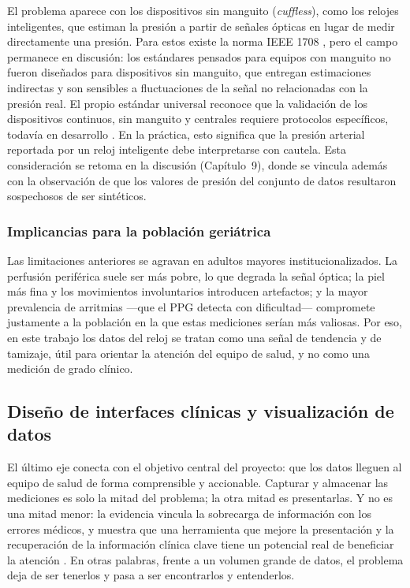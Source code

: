 \documentclass[12pt,a4paper]{article}
\begin{document}
    El problema aparece con los dispositivos sin manguito (\textit{cuffless}), como los relojes inteligentes, que estiman la presión a partir de señales ópticas en lugar de medir directamente una presión. Para estos existe la norma IEEE 1708 \cite{ieee1708}, pero el campo permanece en discusión: los estándares pensados para equipos con manguito no fueron diseñados para dispositivos sin manguito, que entregan estimaciones indirectas y son sensibles a fluctuaciones de la señal no relacionadas con la presión real. El propio estándar universal reconoce que la validación de los dispositivos continuos, sin manguito y centrales requiere protocolos específicos, todavía en desarrollo \cite{stergiou2018}. En la práctica, esto significa que la presión arterial reportada por un reloj inteligente debe interpretarse con cautela. Esta consideración se retoma en la discusión (Capítulo~9), donde se vincula además con la observación de que los valores de presión del conjunto de datos resultaron sospechosos de ser sintéticos.

    \subsubsection{Implicancias para la población geriátrica}
    Las limitaciones anteriores se agravan en adultos mayores institucionalizados. La perfusión periférica suele ser más pobre, lo que degrada la señal óptica; la piel más fina y los movimientos involuntarios introducen artefactos; y la mayor prevalencia de arritmias —que el PPG detecta con dificultad— compromete justamente a la población en la que estas mediciones serían más valiosas. Por eso, en este trabajo los datos del reloj se tratan como una señal de tendencia y de tamizaje, útil para orientar la atención del equipo de salud, y no como una medición de grado clínico.

    \subsection{Diseño de interfaces clínicas y visualización de datos}
    El último eje conecta con el objetivo central del proyecto: que los datos lleguen al equipo de salud de forma comprensible y accionable. Capturar y almacenar las mediciones es solo la mitad del problema; la otra mitad es presentarlas. Y no es una mitad menor: la evidencia vincula la sobrecarga de información con los errores médicos, y muestra que una herramienta que mejore la presentación y la recuperación de la información clínica clave tiene un potencial real de beneficiar la atención \cite{khairat2018}. En otras palabras, frente a un volumen grande de datos, el problema deja de ser tenerlos y pasa a ser encontrarlos y entenderlos.
\end{document}
